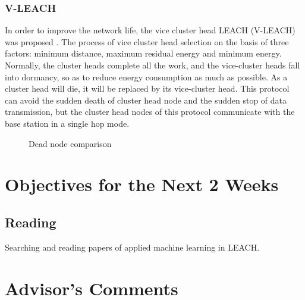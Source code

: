 \documentclass[11pt]{report}
\begin{document}
	\subsubsection{V-LEACH}
	In order to improve the network life, the vice cluster head LEACH (V-LEACH) was proposed \cite{6524310}. The process of vice cluster head selection on the basis of three factors: minimum distance, maximum residual energy and minimum energy. Normally, the cluster heads complete all the work, and the vice-cluster heads fall into dormancy, so as to reduce energy consumption as much as possible. As a cluster head will die, it will be replaced by its vice-cluster head. This protocol can avoid the sudden death of cluster head node and the sudden stop of data transmission, but the cluster head nodes of this protocol communicate with the base station in a single hop mode. 
	\begin{figure}[!h]
		\centering
		\caption{Dead node comparison}
	\end{figure}
	
	
	
	\section{Objectives for the Next 2 Weeks}
	\subsection{Reading} 
	Searching and reading papers of applied machine learning in LEACH.
	
	
	\section{Advisor's Comments}
	
	
	
	
\end{document}

